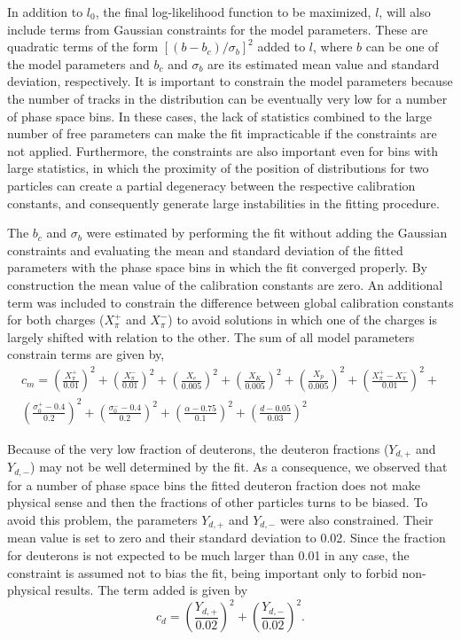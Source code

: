 In addition to $l_0$, the final log-likelihood function
to be maximized, $l$,
will also include terms from Gaussian constraints for the model
parameters. These are quadratic terms of the
form $\left[(b-b_c)/\sigma_b\right]^2$ added to $l$,
where $b$ can be one of the model parameters and 
$b_c$ and $\sigma_b$ are its
estimated mean value and standard deviation, respectively.
It is important to constrain the model parameters because
the number of tracks in the \eps distribution
can be eventually very low for a number of phase space bins.
In these cases, the lack of statistics combined to
the large number of free parameters can make the fit
impracticable if the constraints are not applied.
Furthermore, the constraints are also important
even for bins with large statistics,
in which the proximity of the position of \eps distributions
for two particles can create a partial degeneracy
between the respective calibration constants,
and consequently
generate large instabilities in the fitting procedure.

The $b_c$ and $\sigma_b$ were
estimated by performing the fit without adding
the Gaussian constraints and evaluating
the mean and standard deviation of the fitted parameters
with the phase space bins in which the fit converged properly.
By construction the mean value of the calibration constants
are zero. An additional term was included to constrain the
difference between global calibration constants for both
charges ($X_{\pi}^+$ and $X_{\pi}^-$) to avoid solutions
in which one of the charges is largely shifted
with relation to the other.
The sum of all model parameters constrain terms are given by,
\begin{multline}
  c_m = \left(\frac{X_{\pi}^+}{0.01}\right)^2+\left(\frac{X_{\pi}^-}{0.01}\right)^2+
  \left(\frac{X_{e}}{0.005}\right)^2+\left(\frac{X_{K}}{0.005}\right)^2+
  \left(\frac{X_{p}}{0.005}\right)^2+\left(\frac{X_{\pi}^+-X_{\pi}^-}{0.01}\right)^2+\\
  \left(\frac{\sigma_0^+-0.4}{0.2}\right)^2+\left(\frac{\sigma_0^--0.4}{0.2}\right)^2+
  \left(\frac{\alpha-0.75}{0.1}\right)^2+\left(\frac{d-0.05}{0.03}\right)^2
  \label{eq:hadron:dedx:fit:cm}
\end{multline}

Because of the very low fraction of deuterons,
the deuteron fractions ($Y_{d,+}$ and $Y_{d,-}$)
may not be well determined by the fit. As a consequence, we
observed that for a number of phase space bins the fitted deuteron
fraction does not make physical sense and then the fractions
of other particles turns to be biased. To avoid this problem,
the parameters $Y_{d,+}$ and $Y_{d,-}$ were also
constrained. Their mean value is set
to zero and their standard deviation to 0.02.
Since the fraction for deuterons is not expected
to be much larger than 0.01 in any case, the constraint
is assumed not to bias the fit, being important
only to forbid non-physical results. The term added
is given by
\begin{equation}
  c_d = \left(\frac{Y_{d,+}}{0.02}\right)^2+\left(\frac{Y_{d,-}}{0.02}\right)^2.
  \label{eq:hadron:dedx:fit:cd}
\end{equation}

